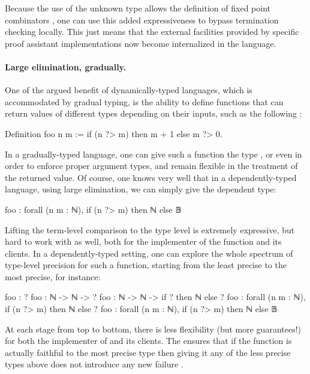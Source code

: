 Because the use of the unknown type allows the definition of fixed point combinators
,
one can use this added expressiveness to bypass termination checking locally.
This just means that the external facilities provided by specific proof assistant implementations now become internalized in the language.

\paragraph{Large elimination, gradually.}
\label{ex:elim}

One of the argued benefit of dynamically-typed languages, which is accommodated by gradual typing, is the ability to define functions that can return values of different types depending on their inputs, such as the following%
:
\begin{coqcode}
  Definition foo n m := if (n ?> m) then m + 1 else m ?> 0.
\end{coqcode}

In a gradually-typed language, one can give such a function the type ,
or even  in order to enforce proper argument types,
and remain flexible in the treatment of the returned value.
Of course, one knows very well that in a dependently-typed language, using large elimination, we can simply give  the dependent type:
\begin{coqcode}
  foo : forall (n m : ℕ), if (n ?> m) then ℕ else 𝔹
\end{coqcode}

Lifting the term-level comparison  to the type level is extremely expressive, but hard to work with as well, both for the implementer of the function and its clients.
In a dependently-typed setting, one can explore the whole spectrum of type-level precision for such a function, starting from the least precise to the most precise, for instance:
\begin{coqcode}
    foo : ?
    foo : ℕ -> ℕ -> ?
    foo : ℕ -> ℕ -> if ? then ℕ else ?
    foo : forall (n m : ℕ), if (n ?> m) then ℕ else ?
    foo : forall (n m : ℕ), if (n ?> m) then ℕ else 𝔹
\end{coqcode}

At each stage from top to bottom, there is less flexibility (but more guarantees!) for both the implementer of  and its clients. The %
ensures that if the function is actually faithful to the most precise type
then giving it any of the less precise types above does not introduce any new failure
.

